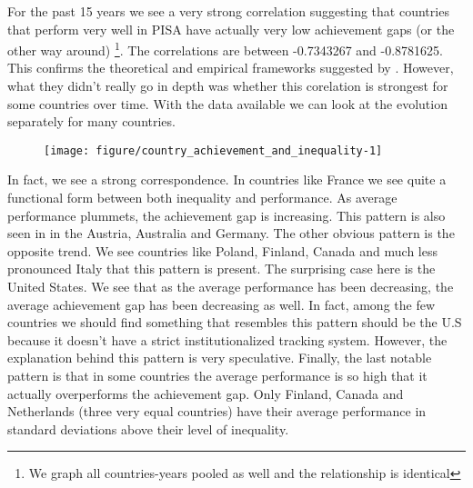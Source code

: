 \documentclass[11pt, a4paper]{article}\usepackage[]{graphicx}\usepackage[]{color}
\begin{document}
For the past 15 years we see a very strong correlation suggesting that countries that perform very well in PISA have actually very low achievement gaps (or the other way around) \footnote{We graph all countries-years pooled as well and the relationship is identical}. The correlations are between -0.7343267 and -0.8781625. This confirms the theoretical and empirical frameworks suggested by \citet{werfhorst_mijs}. However, what they didn't really go in depth was whether this corelation is strongest for some countries over time. With the data available we can look at the evolution separately for many countries.

\begin{figure}
\begin{center}


{\centering \texttt{[image: figure/country\_achievement\_and\_inequality-1]} 

}



\end{center}
\end{figure}

In fact, we see a strong correspondence. In countries like France we see quite a functional form between both inequality and performance. As average performance plummets, the achievement gap is increasing. This pattern is also seen in in the Austria, Australia and Germany. The other obvious pattern is the opposite trend. We see countries like Poland, Finland, Canada and much less pronounced Italy that this pattern is present. The surprising case here is the United States. We see that as the average performance has been decreasing, the average achievement gap has been decreasing as well. In fact, among the few countries we should find something that resembles this pattern should be the U.S because it doesn't have a strict institutionalized tracking system. However, the explanation behind this pattern is very speculative. Finally, the last notable pattern is that in some countries the average performance is so high that it actually overperforms the achievement gap. Only Finland, Canada and Netherlands (three very equal countries) have their average performance in standard deviations above their level of inequality.






\end{document}
